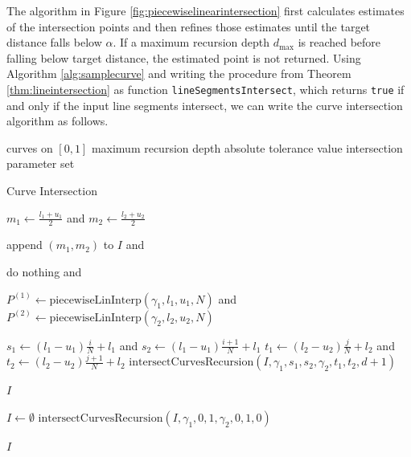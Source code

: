 \documentclass[a4paper, 11pt]{report}
\theoremstyle{definition}
\newcommand{\Desc}[2]{\State \makebox[12em][l]{#1}#2}
\begin{document}
	The algorithm in Figure \ref{fig:piecewiselinearintersection} first calculates estimates of the intersection points and then refines those estimates until the target distance falls below $\alpha$. If a maximum recursion depth $d_{\max}$ is reached before falling below target distance, the estimated point is not returned. Using Algorithm \ref{alg:samplecurve} and writing the procedure from Theorem \ref{thm:lineintersection} as function \texttt{lineSegmentsIntersect}, which returns \texttt{true} if and only if the input line segments intersect, we can write the curve intersection algorithm as follows.

	\begin{algorithm}[H]
		\begin{algorithmic}[1]
			\Input
				\Desc{$\gamma_1, \gamma_2$}{curves on $[0,1]$}
				\Desc{$d_{\max}$}{maximum recursion depth}
				\Desc{$\alpha$}{absolute tolerance value}
			\EndInput
			\Output
				\Desc{$I(\gamma_1, \gamma_2)$}{intersection parameter set}
			\EndOutput

			\caption{Curve Intersection}\label{alg:curveintersection}
				\State $m_1 \gets \frac{l_1 + u_1}{2}$ and $m_2 \gets \frac{l_2 + u_2}{2}$
				
				 append $(m_1, m_2)$ to $I$ and \Return
				\EndIf

				 do nothing and \Return
				\EndIf

				\State $P^{(1)} \gets \text{piecewiseLinInterp}(\gamma_1, l_1, u_1, N)$ and $P^{(2)} \gets \text{piecewiseLinInterp}(\gamma_2, l_2, u_2, N)$
				

							\State $s_1 \gets (l_1 - u_1) \frac{i}{N} + l_1$ and $s_2 \gets (l_1 - u_1) \frac{i+1}{N} + l_1$
							\State $t_1 \gets (l_2 - u_2) \frac{j}{N} + l_2$ and $t_2 \gets (l_2 - u_2) \frac{j+1}{N} + l_2$
							\State $\text{intersectCurvesRecursion}(I, \gamma_1, s_1, s_2, \gamma_2, t_1, t_2, d+1)$
						\EndIf
					\EndFor
				\EndFor

				\State \Return $I$
			\EndProcedure

				\State $I \gets \emptyset$
				\State $\text{intersectCurvesRecursion}(I, \gamma_1, 0, 1, \gamma_2, 0, 1, 0)$

				\State \Return $I$
			\EndProcedure
		\end{algorithmic}
	\end{algorithm}
\end{document}
